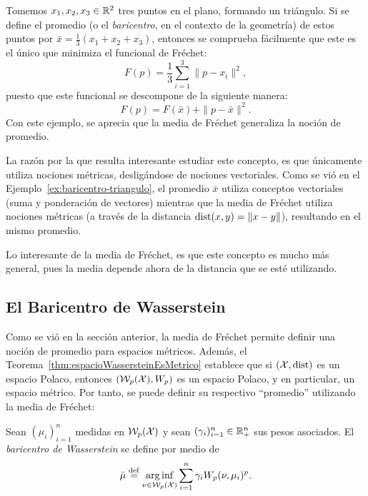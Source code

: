 \begin{example}\label{ex:baricentro-triangulo}
    Tomemos $x_1, x_2, x_3 \in \R^2$ tres puntos en el plano, formando un triángulo. Si se define el promedio (o el \textit{baricentro}, en el contexto de la geometría) de estos puntos por $\bar x = \frac{1}{3} (x_1 + x_2 + x_3)$, entonces se comprueba fácilmente que este es el único que minimiza el funcional de Fréchet:
    \begin{equation}
        F(p) = \frac{1}{3} \sum_{i=1}^{3} \|p - x_i\|^2,
    \end{equation}
    puesto que este funcional se descompone de la siguiente manera:
    \begin{equation}
        F(p) = F(\bar x) + \|p-\bar x\|^2.
    \end{equation}
    Con este ejemplo, se aprecia que la media de Fréchet generaliza la noción de promedio.
\end{example}

La razón por la que resulta interesante estudiar este concepto, es que únicamente utiliza nociones métricas, desligándose de nociones vectoriales. Como se vió en el Ejemplo~\ref{ex:baricentro-triangulo}, el promedio $\bar x$ utiliza conceptos vectoriales (suma y ponderación de vectores) mientras que la media de Fréchet utiliza nociones métricas (a través de la distancia $\dist(x, y) = \|x - y\|$), resultando en el mismo promedio.

Lo interesante de la media de Fréchet, es que este concepto es mucho más general, pues la media depende ahora de la distancia que se esté utilizando.


\subsection{El Baricentro de Wasserstein}\label{ssec:el-baricentro-de-Wasserstein}  %

Como se vió en la sección anterior, la media de Fréchet permite definir una noción de promedio para espacios métricos. Además, el Teorema~\ref{thm:espacioWassersteinEsMetrico} establece que si $(\cX, \dist)$ es un espacio Polaco, entonces $(\WassersteinSpace[p]{\cX}, W_p)$ es un espacio Polaco, y en particular, un espacio métrico. Por tanto, se puede definir su respectivo ``promedio'' utilizando la media de Fréchet:

\begin{definition}\label{def:baricentroWasserstein}
    Sean $(\mu_{i})_{i=1}^{n}$ medidas en $\WassersteinSpace[p]{\cX} $ y sean $(\gamma_{i})_{i=1}^{n} \in \R_+^n$ sus pesos asociados. El \emph{baricentro de Wasserstein} se define por medio de
    \begin{equation}
        \bar \mu \eqdef \arginf_{\nu \in \WassersteinSpace[p]{\cX} } \sum_{i=1}^{n} \gamma_i \Wasserstein[p]{\nu}{\mu_i}^p.
    \end{equation}

\end{definition}

